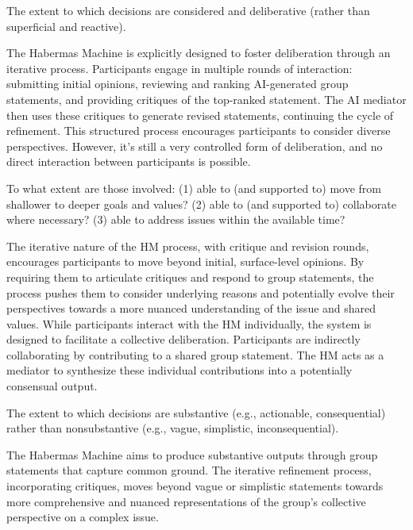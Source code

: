     
    \begin{describe}[grey]
        The extent to which decisions are considered and deliberative (rather than superficial and reactive).
    \end{describe}

    The Habermas Machine is explicitly designed to foster deliberation through an iterative process. Participants engage in multiple rounds of interaction: submitting initial opinions, reviewing and ranking AI-generated group statements, and providing critiques of the top-ranked statement. The AI mediator then uses these critiques to generate revised statements, continuing the cycle of refinement. This structured process encourages participants to consider diverse perspectives. However, it's still a very controlled form of deliberation, and no direct interaction between participants is possible.
    
    \begin{evaluate}[grey]
        To what extent are those involved: (1) able to (and supported to) move from shallower to deeper goals and values? (2) able to (and supported to) collaborate where necessary? (3) able to address issues within the available time?
    \end{evaluate}

    The iterative nature of the HM process, with critique and revision rounds, encourages participants to move beyond initial, surface-level opinions. By requiring them to articulate critiques and respond to group statements, the process pushes them to consider underlying reasons and potentially evolve their perspectives towards a more nuanced understanding of the issue and shared values. While participants interact with the HM individually, the system is designed to facilitate a collective deliberation. Participants are indirectly collaborating by contributing to a shared group statement. The HM acts as a mediator to synthesize these individual contributions into a potentially consensual output.
    
    
    \begin{describe}[grey]
        The extent to which decisions are substantive (e.g., actionable, consequential) rather than nonsubstantive (e.g., vague, simplistic, inconsequential).
    \end{describe}

    The Habermas Machine aims to produce substantive outputs through group statements that capture common ground. The iterative refinement process, incorporating critiques, moves beyond vague or simplistic statements towards more comprehensive and nuanced representations of the group's collective perspective on a complex issue.
    
